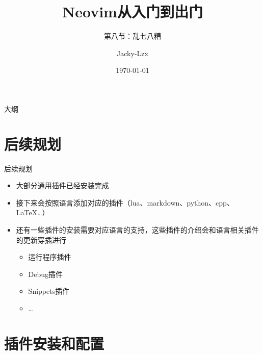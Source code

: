 \documentclass[aspectratio=169]{ctexbeamer}
\title{Neovim从入门到出门}
\subtitle{第八节：乱七八糟}
\author{Jacky-Lzx}
\date{\today}
\begin{document}
\begin{frame}
  \titlepage
\end{frame}
\begin{frame}{大纲}
  \tableofcontents
\end{frame}

\section{后续规划}

\begin{frame}{后续规划}

  \begin{itemize}
    \item 大部分通用插件已经安装完成
    \item 接下来会按照语言添加对应的插件（lua、markdown、python、cpp、LaTeX\ldots）
    \item 还有一些插件的安装需要对应语言的支持，这些插件的介绍会和语言相关插件的更新穿插进行
      \begin{itemize}
        \item 运行程序插件
        \item Debug插件
        \item Snippets插件
        \item \ldots
      \end{itemize}
  \end{itemize}
\end{frame}

\section{插件安装和配置}
\end{document}
